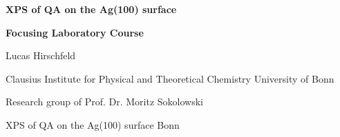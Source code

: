 \begin{titlepage}
	\centering
	{\scshape\LARGE \par}
	\vspace{1cm}
	{\huge\bfseries \textsf{\Acf{XPS} of \Acf{QA} on the Ag(100) surface}\par}
	\vspace{3 cm}
	{\Large\bfseries Focusing Laboratory Course \par}
	\vspace{3cm}
    {\large Lucas Hirschfeld\par}
	\vspace{3cm}
    {\large Clausius Institute for Physical and Theoretical Chemistry
	University of Bonn\par}
	\vspace{2.5cm}
    {\large Research group of Prof. Dr. Moritz Sokolowski\par}
	\Acf{XPS} of \Acf{QA} on the Ag(100) surface
	\vfill
	{\large Bonn
	\the\year{}}
\end{titlepage}


\cleardoublepage

\thispagestyle{empty}
\tableofcontents
\cleardoublepage